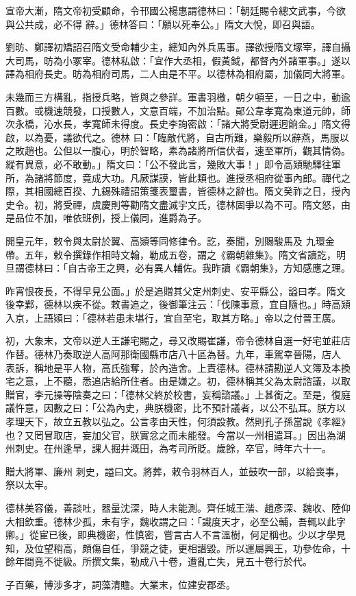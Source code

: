 \begin{pinyinscope}
 宣帝大漸，隋文帝初受顧命，令邗國公楊惠謂德林曰：「朝廷賜令總文武事，今欲與公共成，必不得
 辭。」德林答曰：「願以死奉公。」隋文大悅，即召與語。



 劉昉、鄭譯初矯詔召隋文受命輔少主，總知內外兵馬事。譯欲授隋文塚宰，譯自攝大司馬，昉為小冢宰。德林私啟：「宜作大丞相，假黃鉞，都督內外諸軍事。」遂以譯為相府長史。昉為相府司馬，二人由是不平。以德林為相府屬，加儀同大將軍。



 未幾而三方構亂，指授兵略，皆與之參詳。軍書羽檄，朝夕頓至，一日之中，動逾百數。或機速競發，口授數人，文意百端，不加治點。鄖公韋孝寬為東道元帥，師次永橋，沁水長，孝寬師未得度。長史李詢密啟：「諸大將受尉遲迥餉金。」隋文得啟，以為憂，議欲代之。德林
 曰：「臨敵代將，自古所難，樂毅所以辭燕，馬服以之敗趙也。公但以一腹心，明於智略，素為諸將所信伏者，速至軍所，觀其情偽。縱有異意，必不敢動。」隋文曰：「公不發此言，幾敗大事！」即令高熲馳驛往軍所，為諸將節度，竟成大功。凡厥謀謨，皆此類也。進授丞相府從事內郎。禪代之際，其相國總百揆、九錫殊禮詔策箋表璽書，皆德林之辭也。隋文癸祚之日，授內史令。初，將受禪，虞慶則等勸隋文盡滅宇文氏，德林固爭以為不可。隋文怒，由是品位不加，唯依班例，授上儀同，進爵為子。



 開皇元年，敕令與太尉於翼、高熲等同修律令。訖，奏聞，別賜駿馬及
 九環金帶。五年，敕令撰錄作相時文翰，勒成五卷，謂之《霸朝雜集》。隋文省讀訖，明旦謂德林曰：「自古帝王之興，必有異人輔佐。我昨讀《霸朝集》，方知感應之理。



 昨宵恨夜長，不得早見公面。」於是追贈其父定州刺史、安平縣公，謚曰孝。隋文後幸鄴，德林以疾不從。敕書追之，後御筆注云：「伐陳事意，宜自隨也。」時高熲入京，上語熲曰：「德林若患未堪行，宜自至宅，取其方略。」帝以之付晉王廣。



 初，大象末，文帝以逆人王謙宅賜之，尋又改賜崔謙，帝令德林自選一好宅並莊店作替。德林乃奏取逆人高阿那衛國縣市店八十區為替。九年，車駕幸晉陽，店人
 表訴，稱地是平人物，高氏強奪，於內造舍。上責德林。德林請勘逆人文簿及本換宅之意，上不聽，悉追店給所住者。由是嫌之。初，德林稱其父為太尉諮議，以取贈官，李元操等陰奏之曰：「德林父終於校書，妄稱諮議。」上甚銜之。至是，復庭議忤意，因數之曰：「公為內史，典朕機密，比不預計議者，以公不弘耳。朕方以孝理天下，故立五教以弘之。公言孝由天性，何須設教。然則孔子孫當說《孝經》也？又罔冒取店，妄加父官，朕實忿之而未能發。今當以一州相遣耳。」因出為湖州刺史。在州逢旱，課人掘井溉田，為考司所貶。歲餘，卒官，時年六十一。



 贈大將軍、廉州
 刺史，謚曰文。將葬，敕令羽林百人，並鼓吹一部，以給喪事，祭以太牢。



 德林美容儀，善談吐，器量沈深，時人未能測。齊任城王湝、趙彥深、魏收、陸仰大相欽重。德林少孤，未有字，魏收謂之曰：「識度天才，必至公輔，吾輒以此字卿。」從宦已後，即典機密，性慎密，嘗言古人不言溫樹，何足稱也。少以才學見知，及位望稍高，頗傷自任，爭競之徒，更相譖毀。所以運屬興王，功參佐命，十餘年間竟不徙級。所撰文集，勒成八十卷，遭亂亡失，見五十卷行於代。



 子百藥，博涉多才，詞藻清贍。大業末，位建安郡丞。



\end{pinyinscope}